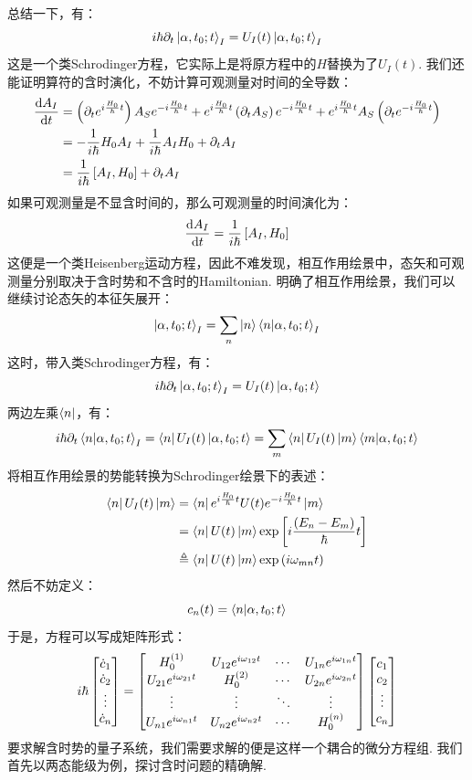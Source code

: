 总结一下，有：
\[
i\hbar\partial_{t}\ket{\alpha,t_{0};t}_{I} = U_{I}(t)\ket{\alpha,t_{0};t}_{I}
\]
这是一个类Schrodinger方程，它实际上是将原方程中的\(H\)替换为了\(U_{I}(t)\). 我们还能证明算符的含时演化，不妨计算可观测量对时间的全导数：
\begin{align*}
\frac{\mathrm{d} A_{I}}{\mathrm{d}t}
& = \left({\partial_{t} e^{i\frac{H_{0}}{\hbar}t}}\right)A_{S}e^{-i\frac{H_{0}}{\hbar}t} + e^{i\frac{H_{0}}{\hbar}t}\left({\partial_{t} A_{S}}\right)e^{-i\frac{H_{0}}{\hbar}t} + e^{i\frac{H_{0}}{\hbar}t}A_{S}\left({\partial_{t} e^{-i\frac{H_{0}}{\hbar}t}}\right) \\
& = -\frac{1}{i\hbar}H_{0}A_{I} + \frac{1}{i\hbar} A_{I}H_{0} + \partial_{t} A_{I} \\
& = \frac{1}{i\hbar}\left[{A_{I},H_{0}}\right] + \partial_{t} A_{I}
\end{align*}
如果可观测量是不显含时间的，那么可观测量的时间演化为：
\[
\frac{\mathrm{d} A_{I}}{\mathrm{d}t} = \frac{1}{i\hbar}\left[{A_{I},H_{0}}\right]
\]
这便是一个类Heisenberg运动方程，因此不难发现，相互作用绘景中，态矢和可观测量分别取决于含时势和不含时的Hamiltonian. 明确了相互作用绘景，我们可以继续讨论态矢的本征矢展开：
\[
\ket{\alpha,t_{0};t}_{I} = \sum_{n}\ket{n}\bra{n}\ket{\alpha,t_{0};t}_{I}
\]
这时，带入类Schrodinger方程，有：
\[
i\hbar\partial_{t}\ket{\alpha,t_{0};t}_{I} = U_{I}(t)\ket{\alpha,t_{0};t}
\]
两边左乘\(\bra{n}\)，有：
\[
i\hbar\partial_{t}\bra{n}\ket{\alpha,t_{0};t}_{I} = \bra{n}U_{I}(t)\ket{\alpha,t_{0};t} = \sum_{m}\bra{n}U_{I}(t)\ket{m}\bra{m}\ket{\alpha,t_{0};t}
\]
将相互作用绘景的势能转换为Schrodinger绘景下的表述：
\begin{align*}
\bra{n}U_{I}(t)\ket{m}
& = \bra{n}e^{i\frac{H_{0}}{\hbar}t}U(t)e^{-i\frac{H_{0}}{\hbar}t}\ket{m} \\
& = \bra{n}U(t)\ket{m}\exp\left[{i\frac{\left({E_{n} - E_{m}}\right)}{\hbar}t}\right] \\
& \triangleq \bra{n}U(t)\ket{m}\exp\left({i\omega_{mn}t}\right)
\end{align*}
然后不妨定义：
\[
c_{n}(t) = \bra{n}\ket{\alpha,t_{0};t}
\]
于是，方程可以写成矩阵形式：
\[
i\hbar
\begin{bmatrix}
\dot{c}_{1} \\
\dot{c}_{2} \\
\vdots \\
\dot{c}_{n}
\end{bmatrix}
= 
\begin{bmatrix}
H_{0}^{(1)} & U_{12}e^{i\omega_{12}t} & \cdots & U_{1n}e^{i\omega_{1n}t} \\
U_{21}e^{i\omega_{21}t} & H_{0}^{(2)} & \cdots & U_{2n}e^{i\omega_{2n}t} \\
\vdots & \vdots & \ddots & \vdots \\
U_{n1}e^{i\omega_{n1}t} & U_{n2}e^{i\omega_{n2}t} & \cdots & H_{0}^{(n)} 
\end{bmatrix}
\begin{bmatrix}
c_{1} \\
c_{2} \\
\vdots \\
c_{n}
\end{bmatrix}
\]
要求解含时势的量子系统，我们需要求解的便是这样一个耦合的微分方程组. 我们首先以两态能级为例，探讨含时问题的精确解. 
